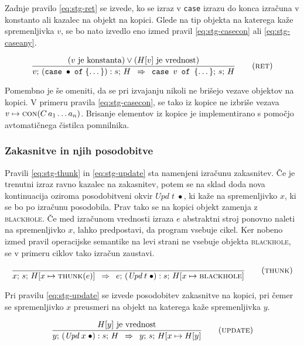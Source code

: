 Zadnje pravilo \ref{eq:stg-ret} se izvede, ko se izraz v \texttt{case} izrazu do konca izračuna v konstanto ali kazalec na objekt na kopici. Glede na tip objekta na katerega kaže spremenljivka $v$, se bo nato izvedlo eno izmed pravil \ref{eq:stg-casecon} ali \ref{eq:stg-caseany}.

\begin{equation}
	\infer[ret]{
		(\text{$v$ je konstanta}) \lor (\text{$H[v]$ je vrednost})
	}{
		v; \, (\texttt{case} \; \bullet \; \texttt{of} \; \{ \dots \}) : s; \, H
	}{
		\texttt{case} \enspace v \enspace \texttt{of} \enspace \{ \dots \}; \, s; \, H
	}
\label{eq:stg-ret}
\end{equation}

Pomembno je še omeniti, da se pri izvajanju nikoli ne brišejo vezave objektov na kopici. V primeru pravila \ref{eq:stg-casecon}, se tako iz kopice ne izbriše vezava $v \mapsto \textsc{con}(C \, a_1 \dots a_n)$. Brisanje elementov iz kopice je implementirano s pomočjo avtomatičnega čistilca pomnilnika.

\subsubsection{Zakasnitve in njih posodobitve}

Pravili \ref{eq:stg-thunk} in \ref{eq:stg-update} sta namenjeni izračunu zakasnitev. Če je trenutni izraz ravno kazalec na zakasnitev, potem se na sklad doda nova kontinuacija oziroma posodobitveni okvir $\textit{Upd} \; t \; \bullet$, ki kaže na spremenljivko $x$, ki se bo po izračunu posodobila. Prav tako se na kopici objekt zamenja z \textsc{blackhole}. Če med izračunom vrednosti izraza $e$ abstraktni stroj ponovno naleti na spremenljivko $x$, lahko predpostavi, da program vsebuje cikel. Ker nobeno izmed pravil operacijske semantike na levi strani ne vsebuje objekta \textsc{blackhole}, se v primeru ciklov tako izračun zaustavi.

\begin{equation}	
\infer[thunk]{}{
	x; \, s; \, H[x \mapsto \textsc{thunk}(e)]
}{
	e; \, (\textit{Upd} \; t \; \bullet) : s; \, H[x \mapsto \textsc{blackhole}]
}
\label{eq:stg-thunk}
\end{equation}

Pri pravilu \ref{eq:stg-update} se izvede posodobitev zakasnitve na kopici, pri čemer se spremenljivko $x$ preusmeri na objekt na katerega kaže spremenljivka $y$.

\begin{equation}
\infer[update]{
	\text{$H[y]$ je vrednost}
}{
	y; \, (\textit{Upd} \; x \; \bullet) : s; \, H
}{
	y; \, s; \, H[x \mapsto H[y]
}
\label{eq:stg-update}
\end{equation}

